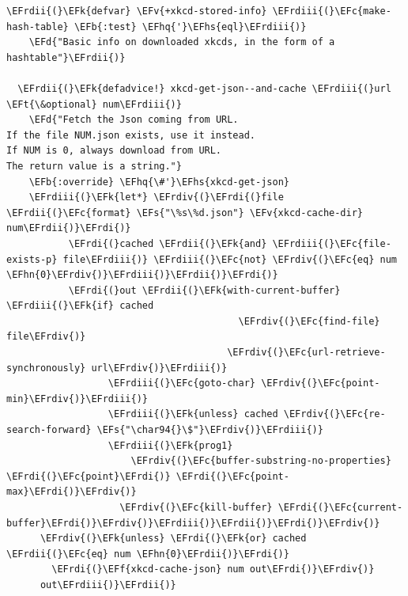 \documentclass{scrartcl}
\newcommand{\EFk}[1]{\textcolor{EFk}{#1}} %
\newcommand{\EFd}[1]{\textcolor{EFd}{#1}} %
\newcommand{\EFt}[1]{\textcolor{EFt}{#1}} %
\newcommand{\EFs}[1]{\textcolor{EFs}{#1}} %
\newcommand{\EFb}[1]{\textcolor{EFb}{#1}} %
\newcommand{\EFc}[1]{\textcolor{EFc}{#1}} %
\newcommand{\EFv}[1]{\textcolor{EFv}{#1}} %
\newcommand{\EFf}[1]{\textcolor{EFf}{#1}} %
\newcommand{\EFhn}[1]{#1} %
\newcommand{\EFhq}[1]{#1} %
\newcommand{\EFhs}[1]{#1} %
\newcommand{\EFrdi}[1]{#1} %
\newcommand{\EFrdii}[1]{#1} %
\newcommand{\EFrdiii}[1]{#1} %
\newcommand{\EFrdiv}[1]{#1} %
\begin{document}
\begin{Code}
\begin{Verbatim}[]
  \EFrdii{(}\EFk{defvar} \EFv{+xkcd-stored-info} \EFrdiii{(}\EFc{make-hash-table} \EFb{:test} \EFhq{'}\EFhs{eql}\EFrdiii{)}
    \EFd{"Basic info on downloaded xkcds, in the form of a hashtable"}\EFrdii{)}

  \EFrdii{(}\EFk{defadvice!} xkcd-get-json--and-cache \EFrdiii{(}url \EFt{\&optional} num\EFrdiii{)}
    \EFd{"Fetch the Json coming from URL.
If the file NUM.json exists, use it instead.
If NUM is 0, always download from URL.
The return value is a string."}
    \EFb{:override} \EFhq{\#'}\EFhs{xkcd-get-json}
    \EFrdiii{(}\EFk{let*} \EFrdiv{(}\EFrdi{(}file \EFrdii{(}\EFc{format} \EFs{"\%s\%d.json"} \EFv{xkcd-cache-dir} num\EFrdii{)}\EFrdi{)}
           \EFrdi{(}cached \EFrdii{(}\EFk{and} \EFrdiii{(}\EFc{file-exists-p} file\EFrdiii{)} \EFrdiii{(}\EFc{not} \EFrdiv{(}\EFc{eq} num \EFhn{0}\EFrdiv{)}\EFrdiii{)}\EFrdii{)}\EFrdi{)}
           \EFrdi{(}out \EFrdii{(}\EFk{with-current-buffer} \EFrdiii{(}\EFk{if} cached
                                         \EFrdiv{(}\EFc{find-file} file\EFrdiv{)}
                                       \EFrdiv{(}\EFc{url-retrieve-synchronously} url\EFrdiv{)}\EFrdiii{)}
                  \EFrdiii{(}\EFc{goto-char} \EFrdiv{(}\EFc{point-min}\EFrdiv{)}\EFrdiii{)}
                  \EFrdiii{(}\EFk{unless} cached \EFrdiv{(}\EFc{re-search-forward} \EFs{"\char94{}\$"}\EFrdiv{)}\EFrdiii{)}
                  \EFrdiii{(}\EFk{prog1}
                      \EFrdiv{(}\EFc{buffer-substring-no-properties} \EFrdi{(}\EFc{point}\EFrdi{)} \EFrdi{(}\EFc{point-max}\EFrdi{)}\EFrdiv{)}
                    \EFrdiv{(}\EFc{kill-buffer} \EFrdi{(}\EFc{current-buffer}\EFrdi{)}\EFrdiv{)}\EFrdiii{)}\EFrdii{)}\EFrdi{)}\EFrdiv{)}
      \EFrdiv{(}\EFk{unless} \EFrdi{(}\EFk{or} cached \EFrdii{(}\EFc{eq} num \EFhn{0}\EFrdii{)}\EFrdi{)}
        \EFrdi{(}\EFf{xkcd-cache-json} num out\EFrdi{)}\EFrdiv{)}
      out\EFrdiii{)}\EFrdii{)}


\end{Verbatim}
\end{Code}
\end{document}
